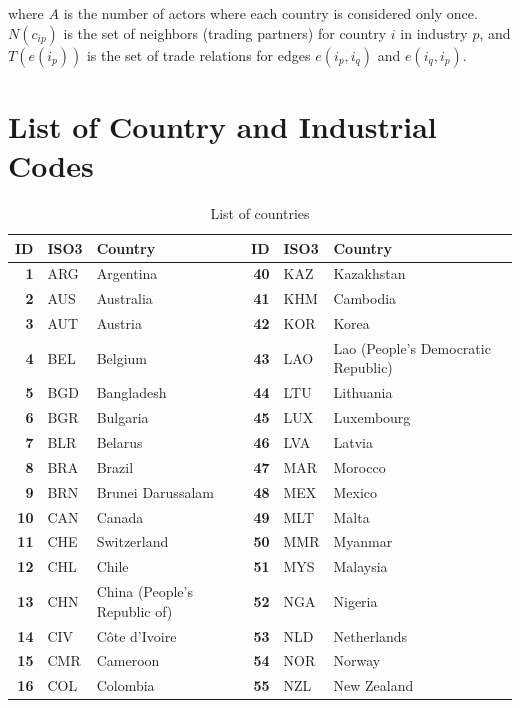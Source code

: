 \documentclass[preprint, 3p,
authoryear]{elsarticle} %
\begin{document}
\noindent  where \(A\) is the number of actors where each country is
considered only once. \(N(c_{ip})\) is the set of neighbors (trading
partners) for country \(i\) in industry \(p\), and \(T(e(i_p))\) is the
set of trade relations for edges \(e(i_p,i_q)\) and \(e(i_q,i_p)\).

\section{List of Country and Industrial
Codes}\label{list-of-country-and-industrial-codes}

\begin{table}[H]
\centering
\caption{\label{tab:countries}List of countries}
\centering
\fontsize{8}{10}\selectfont
\begin{tabular}[t]{>{}r|l>{}l||>{}r|ll}
\toprule
\textbf{ID} & \textbf{ISO3} & \textbf{Country} & \textbf{ID} & \textbf{ISO3} & \textbf{Country}\\
\midrule
\midrule
\textbf{1} & ARG & Argentina & \textbf{40} & KAZ & Kazakhstan\\
\textbf{2} & AUS & Australia & \textbf{41} & KHM & Cambodia\\
\textbf{3} & AUT & Austria & \textbf{42} & KOR & Korea\\
\textbf{4} & BEL & Belgium & \textbf{43} & LAO & Lao (People's Democratic Republic)\\
\textbf{5} & BGD & Bangladesh & \textbf{44} & LTU & Lithuania\\
\textbf{6} & BGR & Bulgaria & \textbf{45} & LUX & Luxembourg\\
\textbf{7} & BLR & Belarus & \textbf{46} & LVA & Latvia\\
\textbf{8} & BRA & Brazil & \textbf{47} & MAR & Morocco\\
\textbf{9} & BRN & Brunei Darussalam & \textbf{48} & MEX & Mexico\\
\textbf{10} & CAN & Canada & \textbf{49} & MLT & Malta\\
\textbf{11} & CHE & Switzerland & \textbf{50} & MMR & Myanmar\\
\textbf{12} & CHL & Chile & \textbf{51} & MYS & Malaysia\\
\textbf{13} & CHN & China (People's Republic of) & \textbf{52} & NGA & Nigeria\\
\textbf{14} & CIV & Côte d'Ivoire & \textbf{53} & NLD & Netherlands\\
\textbf{15} & CMR & Cameroon & \textbf{54} & NOR & Norway\\
\textbf{16} & COL & Colombia & \textbf{55} & NZL & New Zealand\\

\end{tabular}
\end{table}
\end{document}
